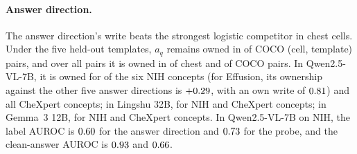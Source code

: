 \documentclass{article}
\begin{document}
\paragraph{Answer direction.} The answer direction's write beats the strongest logistic competitor in \cfAnsChestBeats{} chest cells. Under the five held-out templates, $a_q$ remains owned in \cfAnsdirtCocoKept{} of \cfAnsdirtCocoKeptN{} COCO (cell, template) pairs, and over all pairs it is owned in \cfAnsdirtChestOwnedPairs{} of \cfAnsdirtChestPairsAll{} chest and \cfAnsdirtCocoOwnedPairs{} of \cfAnsdirtCocoPairsAll{} COCO pairs. In Qwen2.5-VL-7B, it is owned for \cfAnsQwenOwnedNih{} of the six NIH concepts (for Effusion, its ownership against the other five answer directions is $+0.29$, with an own write of $0.81$) and all \cfAnsQwenOwnedChex{} CheXpert concepts; in Lingshu 32B, for \cfAnsLingOwnedNih{} NIH and \cfAnsLingOwnedChex{} CheXpert concepts; in Gemma~3 12B, for \cfAnsGemOwnedNih{} NIH and \cfAnsGemOwnedChex{} CheXpert concepts. In Qwen2.5-VL-7B on NIH, the label AUROC is $0.60$ for the answer direction and $0.73$ for the probe, and the clean-answer AUROC is $0.93$ and $0.66$.
\end{document}
